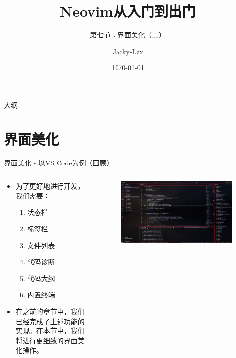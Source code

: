 \documentclass[aspectratio=169]{ctexbeamer}
\title{Neovim从入门到出门}
\subtitle{第七节：界面美化（二）}
\author{Jacky-Lzx}
\date{\today}
\begin{document}
\begin{frame}
  \titlepage
\end{frame}
\begin{frame}{大纲}
  \tableofcontents
\end{frame}

\section{界面美化}
\begin{frame}{界面美化 - 以VS Code为例（回顾）}
  \begin{columns}
    \begin{column}{0.3\linewidth}
      \begin{itemize}
        \item 为了更好地进行开发，我们需要：
          \begin{enumerate}[label=\arabic*.]
            \item 状态栏 
            \item 标签栏 
            \item 文件列表 
            \item 代码诊断 
            \item 代码大纲 
            \item 内置终端 
          \end{enumerate}
        \item 在之前的章节中，我们已经完成了上述功能的实现。在本节中，我们将进行更细致的界面美化操作。
      \end{itemize}
    \end{column}

    \begin{column}{0.7\linewidth}
      \begin{figure}[H]
        \centering
        \includegraphics[width=0.9\linewidth]{./Figures/Vscode_interface_annotated.jpg}
      \end{figure}
    \end{column}
  \end{columns}

\end{frame}
\end{document}
